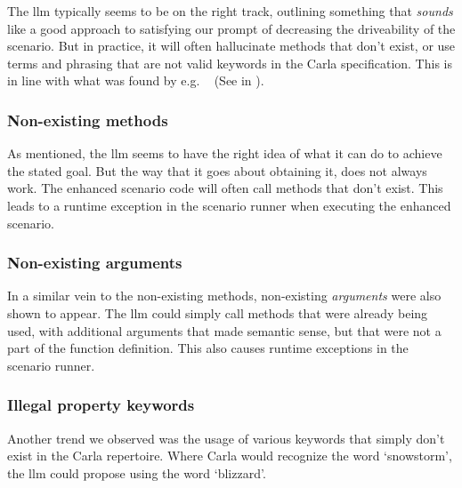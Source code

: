 The \acrshort{llm} typically seems to be on the right track, outlining something
that \emph{sounds} like a good approach to satisfying our prompt of decreasing
the driveability of the scenario. But in practice, it will often hallucinate
methods that don't exist, or use terms and phrasing that are not valid keywords
in the Carla specification. This is in line with what was found by e.g.
\citeauthor{autoSceneGen}~\cite[14542]{autoSceneGen} (See  in
).

\subsubsection{Non-existing methods}

As mentioned, the \acrshort{llm} seems to have the right idea of what it can do
to achieve the stated goal. But the way that it goes about obtaining it, does
not always work. The enhanced scenario code will often call methods that don't
exist. This leads to a runtime exception in the scenario runner when executing
the enhanced scenario.

\subsubsection{Non-existing arguments}

In a similar vein to the non-existing methods, non-existing \emph{arguments}
were also shown to appear. The \acrshort{llm} could simply call methods that
were already being used, with additional arguments that made semantic sense,
but that were not a part of the function definition. This also causes runtime
exceptions in the scenario runner.

\subsubsection{Illegal property keywords}

Another trend we observed was the usage of various keywords that simply don't
exist in the Carla repertoire. Where Carla would recognize the word `snowstorm',
the \acrfull{llm} could propose using the word `blizzard'.
